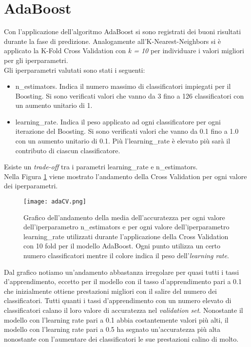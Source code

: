 \section{AdaBoost}
Con l'applicazione dell'algoritmo AdaBoost si sono registrati dei buoni risultati durante la fase di predizione. Analogamente all'K-Nearest-Neighbors si è applicato la K-Fold Cross Validation con \emph{k = 10} per individuare i valori migliori per gli iperparametri.\\
Gli iperparametri valutati sono stati i seguenti:
\begin{itemize}
	\item \textsf{n\_estimators}. Indica il numero massimo di classificatori impiegati per il Boosting. Si sono verificati valori che vanno da 3 fino a 126 classificatori con un aumento unitario di 1.
	\item \textsf{learning\_rate}. Indica il peso applicato ad ogni classificatore per ogni iterazione del Boosting. Si sono verificati valori che vanno da 0.1 fino a 1.0 con un aumento unitario di 0.1. Più l'\textsf{learning\_rate} è elevato più sarà il contributo di ciascun classificatore.
\end{itemize}
Esiste un \emph{trade-off} tra i parametri \textsf{learning\_rate} e \textsf{n\_estimators}.\\
Nella Figura \ref{fig:adaCV} viene mostrato l'andamento della Cross Validation per ogni valore dei iperparametri.
\begin{figure}[h]
	\begin{center}
		\texttt{[image: adaCV.png]}
		\caption{Grafico dell'andamento della media dell'accuratezza per ogni valore dell'iperparametro \textsf{n\_estimators} e per ogni valore dell'iperparametro \textsf{learning\_rate} utilizzati durante l'applicazione della Cross Validation con 10 fold per il modello AdaBoost. Ogni punto utilizza un certo numero classificatori mentre il colore indica il peso dell'\emph{learning rate}.
		} 
		\label{fig:adaCV}
	\end{center}
\end{figure}
Dal grafico notiamo un'andamento abbastanza irregolare per quasi tutti i tassi d'apprendimento, eccetto per il modello con il tasso d'apprendimento pari a 0.1 che inizialmente ottiene prestazioni migliori con il salire del numero dei classificatori. Tutti quanti i tassi d'apprendimento con un numero elevato di classificatori calano il loro valore di accuratezza nel \emph{validation set}. Nonostante il modello con l'learning rate pari a 0.1 abbia costantemente valori più alti, il modello con l'learning rate pari a 0.5 ha segnato un'accuratezza più alta nonostante con l'aumentare dei classificatori le sue prestazioni calino di molto. \\
